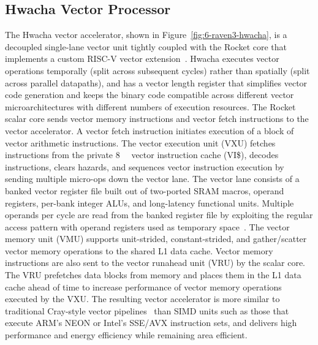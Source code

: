 \documentclass[graybox]{svmult}
\begin{document}
\subsection{Hwacha Vector Processor}

The Hwacha vector accelerator, shown in Figure~\ref{fig:6-raven3-hwacha}, is a decoupled single-lane vector unit tightly coupled with the Rocket core that implements a custom RISC-V vector extension~\cite{Lee2014}.
Hwacha executes vector operations temporally (split across subsequent cycles) rather than spatially (split across parallel datapaths), and has a vector length register that simplifies vector code generation and keeps the binary code compatible across different vector microarchitectures with different numbers of execution resources.
The Rocket scalar core sends vector memory instructions and vector fetch instructions to the vector accelerator.
A vector fetch instruction initiates execution of a block of vector arithmetic instructions.
The vector execution unit (VXU) fetches instructions from the private \SI{8}{\kibi\byte} vector instruction cache (VI\$), decodes instructions, clears hazards, and sequences vector instruction execution by sending multiple micro-ops down the vector lane.
The vector lane consists of a banked vector register file built out of two-ported SRAM macros, operand registers, per-bank integer ALUs, and long-latency functional units.
Multiple operands per cycle are read from the banked register file by exploiting the regular access pattern with operand registers used as temporary space~\cite{Lee2014}.
The vector memory unit (VMU) supports unit-strided, constant-strided, and gather/scatter vector memory operations to the shared L1 data cache.
Vector memory instructions are also sent to the vector runahead unit (VRU) by the scalar core.
The VRU prefetches data blocks from memory and places them in the L1 data cache ahead of time to increase performance of vector memory operations executed by the VXU.
The resulting vector accelerator is more similar to traditional Cray-style vector pipelines~\cite{Russel1978} than SIMD units such as those that execute ARM's NEON or Intel's SSE/AVX instruction sets, and delivers high performance and energy efficiency while remaining area efficient.
\end{document}
